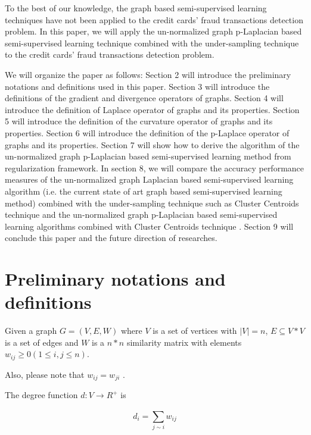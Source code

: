 To the best of our knowledge, the graph based semi-supervised learning techniques \citep{shin2007graph} have not been applied to the credit cards’ fraud transactions detection problem. In this paper, we will apply the un-normalized graph p-Laplacian based semi-supervised learning technique \citep{tran2015normalized, tran2017normalized} combined with the under-sampling technique to the credit cards’ fraud transactions detection problem.

We will organize the paper as follows: Section 2 will introduce the preliminary notations and definitions used in this paper. Section 3 will introduce the definitions of the gradient and divergence operators of graphs. Section 4 will introduce the definition of Laplace operator of graphs and its properties. Section 5 will introduce the definition of the curvature operator of graphs and its properties. Section 6 will introduce the definition of the p-Laplace operator of graphs and its properties. Section 7 will show how to derive the algorithm of the un-normalized graph p-Laplacian based semi-supervised learning method from regularization framework. In section 8, we will compare the accuracy performance measures of the un-normalized graph Laplacian based semi-supervised learning algorithm (i.e. the current state of art graph based semi-supervised learning method) combined with the under-sampling technique such as Cluster Centroids technique \citep{yen2009cluster} and the un-normalized graph p-Laplacian based semi-supervised learning algorithms combined with Cluster Centroids technique \citep{yen2009cluster}. Section 9 will conclude this paper and the future direction of researches.


\section{Preliminary notations and definitions}

Given a graph  $G = (V, E, W)$  where  $V$  is a set of vertices with  $\vert V \vert = n$, $E \subseteq V \ast V$ is a set of edges and  $W$ is a  $n\ast n$  similarity matrix with elements  $w_{ij} \geq 0  \left( 1 \leq i,j \leq n \right)  $.

Also, please note that  $ w_{ij}=w_{ji} $ .

The degree function  \( d:V \rightarrow R^{+} \)  is 


\begin{equation}
d_{i}= \sum _{j \sim i}^{}w_{ij}
\end{equation}


